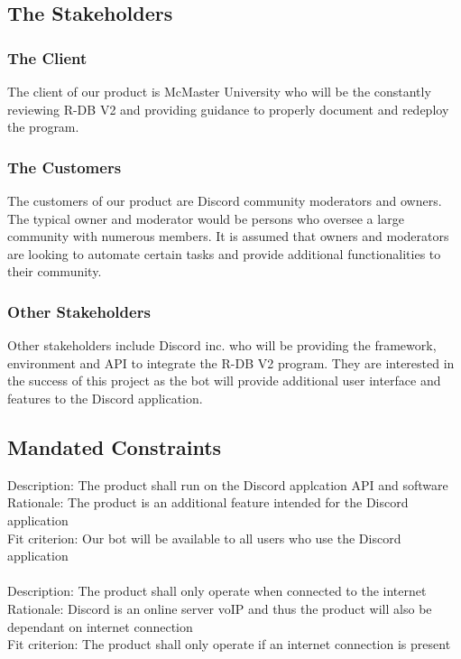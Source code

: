 \documentclass[12pt, titlepage]{article}
\begin{document}
\subsection{The Stakeholders}

\subsubsection{The Client}
	The client of our product is McMaster University who will be the constantly reviewing R-DB V2 and providing guidance to properly document and redeploy the program.

\subsubsection{The Customers}
	The customers of our product are Discord community moderators and owners. The typical owner and moderator would be persons who oversee a large community with numerous members. It is assumed that owners and moderators are looking to automate certain tasks and provide additional functionalities to their community. 


\subsubsection{Other Stakeholders}
Other stakeholders include Discord inc. who will be providing the framework, environment and API to integrate the R-DB V2 program. They are interested in the success of this project as the bot will provide additional user interface and features to the Discord application.

\subsection{Mandated Constraints}
Description: The product shall run on the Discord applcation API and software\\
Rationale: The product is an additional feature intended for the Discord application\\
Fit criterion: Our bot will be available to all users who use the Discord application\\\\

\noindent
Description: The product shall only operate when connected to the internet\\
Rationale: Discord is an online server voIP and thus the product will also be dependant on internet connection\\
Fit criterion: The product shall only operate if an internet connection is present\\
\end{document}
